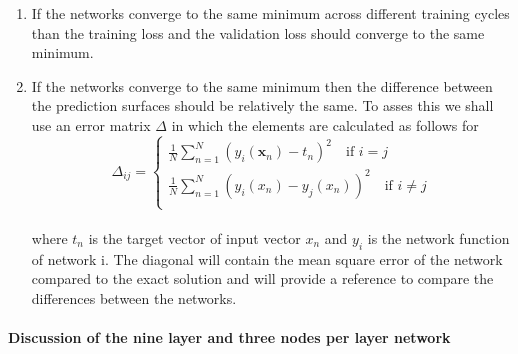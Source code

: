 \documentclass[12pt]{article}
\begin{document}
\begin{enumerate}
	\item If the networks converge to the same minimum across different training cycles than the training loss and the validation loss should converge to the same minimum.
	\item If the networks converge to the same minimum then the difference between the prediction surfaces should be relatively the same. To asses this we shall use an error matrix $\Delta$ in which the elements are calculated as follows for 
	\\
	\begin{equation*}
	\Delta_{ij} =
	\begin{cases}
	\frac{1}{N} \sum_{n=1}^{N} \left(y_{i}(\textbf{x}_n)-t_n\right)^2 \quad \text{if } i=j \\
	\frac{1}{N} \sum_{n=1}^{N} \left(y_{i}(x_n)-y_{j}(x_n)\right)^2 \quad \text{if } i \neq j \\
	\end{cases}
	\end{equation*}
	\\
	where $t_n$ is the target vector of input vector $x_n$ and $y_i$ is the network function of network i. The diagonal will contain the mean square error of the network compared to the exact solution and will provide a reference to compare the differences between the networks.
\end{enumerate}

\paragraph{Discussion of the nine layer and three nodes per layer network}
\end{document}
